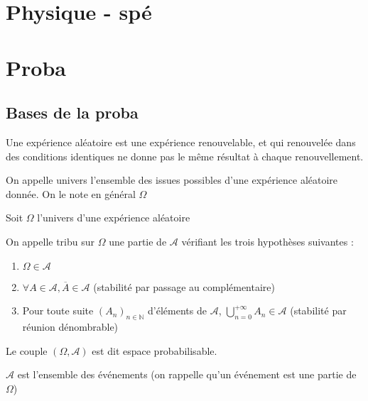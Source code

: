 \documentclass[a4paper,12pt]{book}
\newcommand{\Def}[2]{\begin{tcolorbox}[colback=white,colframe=red!10!green!20!blue!75!, title=Définition : #1]#2\end{tcolorbox}}
\def\N{\mathbb{N}}
\begin{document}
\chapter{Physique - spé}
















\chapter{Proba}
\section{Bases de la proba}
\Def{}{Une expérience aléatoire est une expérience renouvelable, et qui renouvelée dans des conditions identiques ne donne pas le même résultat à chaque renouvellement.}
\Def{}{On appelle univers l'ensemble des issues possibles d'une expérience aléatoire donnée. On le note en général $\Omega$}
\Def{}{Soit $\Omega$ l'univers d'une expérience aléatoire
\par On appelle tribu sur $\Omega$ une partie de $\mathcal{A}$ vérifiant les trois hypothèses suivantes :\begin{enumerate}
\item $\Omega\in \mathcal{A}$
\item $\forall A\in \mathcal{A},\overline{A}\in \mathcal{A}$ (stabilité par passage au complémentaire)
\item Pour toute suite $(A_n)_{n\in\N}$ d'éléments de $\mathcal{A}$, $\bigcup_{n=0}^{+\infty}A_n\in\mathcal{A}$ (stabilité par réunion dénombrable)
\end{enumerate}
Le couple $(\Omega, \mathcal{A})$ est dit espace probabilisable.
\par $\mathcal{A}$ est l'ensemble des événements (on rappelle qu'un événement est une partie de $\Omega$)}
\end{document}
